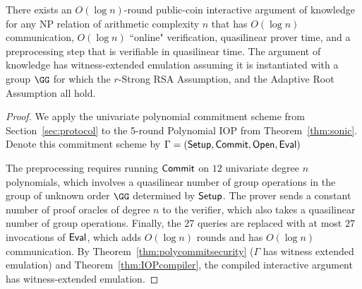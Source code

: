 \begin{theorem}
There exists an $O(\log n)$-round public-coin interactive argument of knowledge for any NP relation of arithmetic complexity $n$ that has $O(\log n)$ communication, $O(\log n)$ ``online" verification, quasilinear prover time, and a preprocessing step that is verifiable in quasilinear time. The argument of knowledge has witness-extended emulation assuming it is instantiated with a group $\GG$ for which the $r$-Strong RSA Assumption, and the Adaptive Root Assumption all hold. 
\end{theorem}
\begin{proof}
We apply the univariate polynomial commitment scheme from Section~\ref{sec:protocol} to the 5-round Polynomial IOP from Theorem~\ref{thm:sonic}. Denote this commitment scheme by $\Gamma = (\textsf{{Setup}}, \textsf{{Commit}}, \textsf{{Open}}, \textsf{{Eval}})$ 

The preprocessing requires running $\textsf{{Commit}}$ on $12$ univariate degree $n$ polynomials, which involves a quasilinear number of group operations in the group of unknown order $\GG$ determined by $\textsf{{Setup}}$. The prover sends a constant number of proof oracles of degree $n$ to the verifier, which also takes a quasilinear number of group operations. Finally, the 27 queries are replaced with at most $27$ invocations of $\textsf{{Eval}}$, which adds $O(\log n )$ rounds and has $O(\log n)$ communication. By Theorem~\ref{thm:polycommitsecurity} ($\Gamma$ has witness extended emulation) and Theorem~\ref{thm:IOPcompiler}, the compiled interactive argument has witness-extended emulation.

\end{proof}

\ifappendix
\else

\fi


